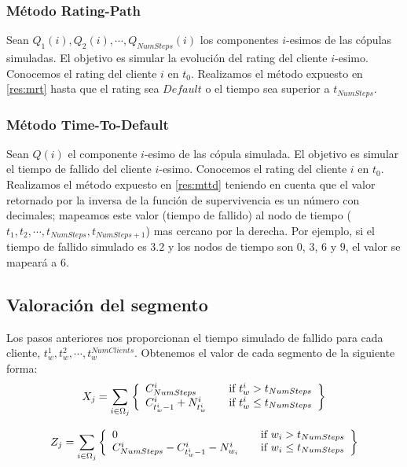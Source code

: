 \subsubsection{M\'etodo Rating-Path}

Sean $Q_1(i), Q_2(i), \cdots, Q_{NumSteps}(i)$ los componentes $i$-esimos
de las c\'opulas simuladas. El objetivo es simular la evoluci\'on del
rating del cliente $i$-esimo. Conocemos el rating del cliente $i$
en $t_0$. Realizamos el m\'etodo expuesto en \ref{res:mrt} hasta que
el rating sea $Default$ o el tiempo sea superior a $t_{NumSteps}$.

\subsubsection{M\'etodo Time-To-Default}

Sean $Q(i)$ el componente $i$-esimo de las c\'opula simulada. El objetivo es
simular el tiempo de fallido del cliente $i$-esimo. Conocemos el rating del
cliente $i$ en $t_0$. Realizamos el m\'etodo expuesto en \ref{res:mttd} teniendo
en cuenta que el valor retornado por la inversa de la funci\'on de supervivencia
es un n\'umero con decimales; mapeamos este valor (tiempo de fallido) al
nodo de tiempo ($t_1, t_2, \cdots, t_{NumSteps}, t_{NumSteps+1}$) mas cercano
por la derecha. Por ejemplo, si el tiempo de fallido simulado es $3.2$ y los nodos
de tiempo son $0$, $3$, $6$ y $9$, el valor se mapear\'a a $6$.

\subsection{Valoraci\'on del segmento}

Los pasos anteriores nos proporcionan el tiempo simulado de fallido
para cada cliente, $t_w^1, t_w^2, \cdots, t_w^{NumClients}$. Obtenemos el
valor de cada segmento de la siguiente forma:
\begin{displaymath}
X_j = \sum_{i \in \Omega_j} \left\{
\begin{array}{ll}
C_{NumSteps}^i              & \quad \textrm{if } t_w^i > t_{NumSteps}    \cr
C_{t_w^i-1}^i + N_{t_w^i}^i & \quad \textrm{if } t_w^i \leq t_{NumSteps} \cr
\end{array}
\right\}
\end{displaymath}

\begin{displaymath}
Z_j = \sum_{i \in \Omega_j} \left\{
\begin{array}{ll}
0                                          & \quad \textrm{if } w_i > t_{NumSteps}    \cr
C_{NumSteps}^i - C_{t_w^i-1}^i - N_{w_i}^i & \quad \textrm{if } w_i \leq t_{NumSteps} \cr
\end{array}
\right\}
\end{displaymath}

